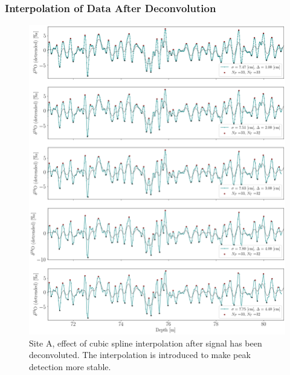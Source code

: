 \documentclass[../../CompleteThesis2/Complete_2ndDraft]{subfiles}
\begin{document}
\subsubsection[Interpolation 2]{Interpolation of Data After Deconvolution}
\label{Subsubsec:METH_Interpolation_AFdecon}
\begin{figure}[h]
	\centering
	\includegraphics[width=\textwidth]{SiteA_InterpAF_SpecificResampling_BD.png}
	\caption[Back diffused data, Site A, different resamplings after deconvolution.]{\small Site A, effect of cubic spline interpolation after signal has been deconvoluted. The interpolation is introduced to make peak detection more stable.}
	\label{Fig:COMPMETH_SiteA_InterpAF_4samplings}
\end{figure}
\end{document}
